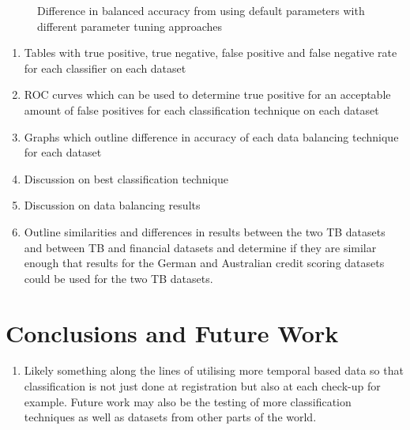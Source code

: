 \documentclass{sig-alternate-05-2015}
\begin{document}
	\begin{figure}
		\centering
		\caption{Difference in balanced accuracy from using default parameters with different parameter tuning approaches}
		\label{fig:res}
	\end{figure}
	

	\label{results}
	\begin{enumerate}
		\item Tables with true positive, true negative, false positive and false negative rate for each classifier on each dataset
		\item ROC curves which can be used to determine true positive for an acceptable amount of false positives for each classification technique on each dataset
		\item Graphs which outline difference in accuracy of each data balancing technique for each dataset
		\item Discussion on best classification technique
		\item Discussion on data balancing results
		\item Outline similarities and differences in results between the two TB datasets and between TB and financial datasets and determine if they are similar enough that results for the German and Australian credit scoring datasets could be used for the two TB datasets.
	\end{enumerate}
	
	\section{Conclusions and Future Work}
	\begin{enumerate}
		\item Likely something along the lines of utilising more temporal based data so that classification is not just done at registration but also at each check-up for example. Future work may also be the testing of more classification techniques as well as datasets from other parts of the world.
	\end{enumerate}
	
	
\end{document}
